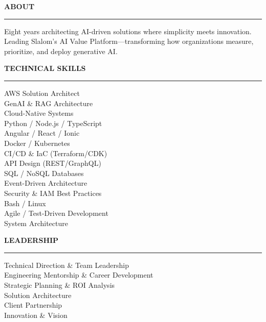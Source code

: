 \documentclass[10pt,letterpaper]{article}
\newcommand{\sectiontitle}[1]{%
    \vspace{10pt}
    {\displayfont\normalsize\textcolor{headerBg}{\MakeUppercase{\textbf{#1}}}}
    \vspace{2pt}
    \par\noindent\textcolor{accentCyan}{\rule{1.2in}{2.5pt}}
    \vspace{6pt}
}
\begin{document}
\noindent\colorbox{lightBg}{%
\begin{minipage}[t][8.6in][t]{\paperwidth}
\vspace{0.3in}
\hspace{0.5in}
\begin{minipage}[t]{3.2in}
\raggedright

\sectiontitle{About}
{\small\textcolor{darktext}{Eight years architecting AI-driven solutions where simplicity meets innovation. Leading Slalom's AI Value Platform—transforming how organizations measure, prioritize, and deploy generative AI.}}

\sectiontitle{Technical Skills}
{\scriptsize\textcolor{mediumtext}{
\textcolor{accentCyan}{\textbullet} AWS Solution Architect\\[4pt]
\textcolor{accentCyan}{\textbullet} GenAI \& RAG Architecture\\[4pt]
\textcolor{accentCyan}{\textbullet} Cloud-Native Systems\\[4pt]
\textcolor{accentCyan}{\textbullet} Python / Node.js / TypeScript\\[4pt]
\textcolor{accentCyan}{\textbullet} Angular / React / Ionic\\[4pt]
\textcolor{accentCyan}{\textbullet} Docker / Kubernetes\\[4pt]
\textcolor{accentCyan}{\textbullet} CI/CD \& IaC (Terraform/CDK)\\[4pt]
\textcolor{accentCyan}{\textbullet} API Design (REST/GraphQL)\\[4pt]
\textcolor{accentCyan}{\textbullet} SQL / NoSQL Databases\\[4pt]
\textcolor{accentCyan}{\textbullet} Event-Driven Architecture\\[4pt]
\textcolor{accentCyan}{\textbullet} Security \& IAM Best Practices\\[4pt]
\textcolor{accentCyan}{\textbullet} Bash / Linux\\[4pt]
\textcolor{accentCyan}{\textbullet} Agile / Test-Driven Development\\[4pt]
\textcolor{accentCyan}{\textbullet} System Architecture\\[4pt]
}}

\sectiontitle{Leadership}
{\scriptsize\textcolor{mediumtext}{
\textcolor{accentGreen}{\textbullet} Technical Direction \& Team Leadership\\[4pt]
\textcolor{accentGreen}{\textbullet} Engineering Mentorship \& Career Development\\[4pt]
\textcolor{accentGreen}{\textbullet} Strategic Planning \& ROI Analysis\\[4pt]
\textcolor{accentGreen}{\textbullet} Solution Architecture\\[4pt]
\textcolor{accentGreen}{\textbullet} Client Partnership\\[4pt]
\textcolor{accentGreen}{\textbullet} Innovation \& Vision\\[4pt]
}}


\end{minipage}
\end{minipage}}
\end{document}
